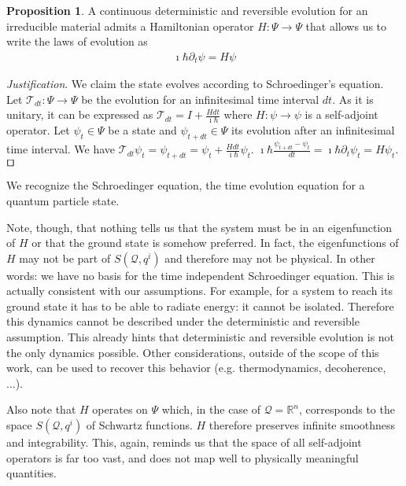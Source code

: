 \documentclass[smallextended]{svjour3}
\numberwithin{equation}{section}
\newenvironment{justification}{\emph{Justification}.}{\hfill\(\qed\)}
\theoremstyle{definition}
\newtheorem{prop}[equation]{Proposition}
\newenvironment{justification}{\emph{Justification}.}{\qed}
\begin{document}
	
\begin{prop}\label{prop:schroedinger_equation}
	A continuous deterministic and reversible evolution for an irreducible material admits a Hamiltonian operator $H : \Psi \rightarrow \Psi$ that allows us to write the laws of evolution as
	\begin{align*}
	\imath \hbar \partial_t \psi = H \psi
	\end{align*}
\end{prop}

\begin{justification}
	We claim the state evolves according to Schroedinger's equation. Let  $\mathcal{T}_{dt}: \Psi \rightarrow \Psi$ be the evolution for an infinitesimal time interval $dt$. As it is unitary, it can be expressed as $\mathcal{T}_{dt} = I + \frac{H dt}{\imath \hbar}$ where $H : \psi \rightarrow \psi$ is a self-adjoint operator. Let $\psi_t \in \Psi$ be a state and $\psi_{t+dt} \in \Psi$ its evolution after an infinitesimal time interval. We have $\mathcal{T}_{dt} \psi_t = \psi_{t+dt} = \psi_t + \frac{H dt}{\imath \hbar} \psi_t$. $\imath \hbar \frac{\psi_{t+dt} - \psi_t}{dt} = \imath \hbar \partial_t \psi_t = H\psi_t$.
\end{justification}

We recognize the Schroedinger equation, the time evolution equation for a quantum particle state.

Note, though, that nothing tells us that the system must be in an eigenfunction of $H$ or that the ground state is somehow preferred. In fact, the eigenfunctions of $H$ may not be part of $S(\mathcal{Q}, q^i)$ and therefore may not be physical. In other words: we have no basis for the time independent Schroedinger equation. This is actually consistent with our assumptions. For example, for a system to reach its ground state it has to be able to radiate energy: it cannot be isolated. Therefore this dynamics cannot be described under the deterministic and reversible assumption. This already hints that deterministic and reversible evolution is not the only dynamics possible. Other considerations, outside of the scope of this work, can be used to recover this behavior (e.g. thermodynamics, decoherence, ...).

Also note that $H$ operates on $\Psi$ which, in the case of $\mathcal{Q}=\mathbb{R}^n$, corresponds to the space $S(\mathcal{Q}, q^i)$ of Schwartz functions. $H$ therefore preserves infinite smoothness and integrability. This, again, reminds us that the space of all self-adjoint operators is far too vast, and does not map well to physically meaningful quantities.
\end{document}
